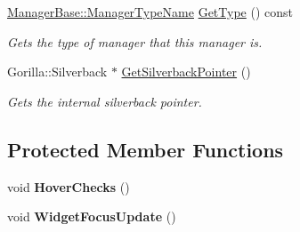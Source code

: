 \begin{DoxyCompactItemize}
\hyperlink{classphys_1_1ManagerBase_aaa6ccddf23892eaccb898529414f80a5}{ManagerBase::ManagerTypeName} \hyperlink{classphys_1_1UIManager_ab8fe74564ca5dc09cbe4b1cc2c007e79}{GetType} () const 
\begin{DoxyCompactList}\small\item\em Gets the type of manager that this manager is. \item\end{DoxyCompactList}\item 
Gorilla::Silverback $\ast$ \hyperlink{classphys_1_1UIManager_a21623edd39c3e23de29f4cf3ed6e490a}{GetSilverbackPointer} ()
\begin{DoxyCompactList}\small\item\em Gets the internal silverback pointer. \item\end{DoxyCompactList}\end{DoxyCompactItemize}
\subsection*{Protected Member Functions}
\begin{DoxyCompactItemize}
\item 
\hypertarget{classphys_1_1UIManager_ae5beaafe73c68d39eb84463033941057}{
void {\bfseries HoverChecks} ()}
\label{d5/dc5/classphys_1_1UIManager_ae5beaafe73c68d39eb84463033941057}

\item 
\hypertarget{classphys_1_1UIManager_aae0b6d575ea583154ca0257fb40d5ae7}{
void {\bfseries WidgetFocusUpdate} ()}
\label{d5/dc5/classphys_1_1UIManager_aae0b6d575ea583154ca0257fb40d5ae7}

\end{DoxyCompactItemize}
